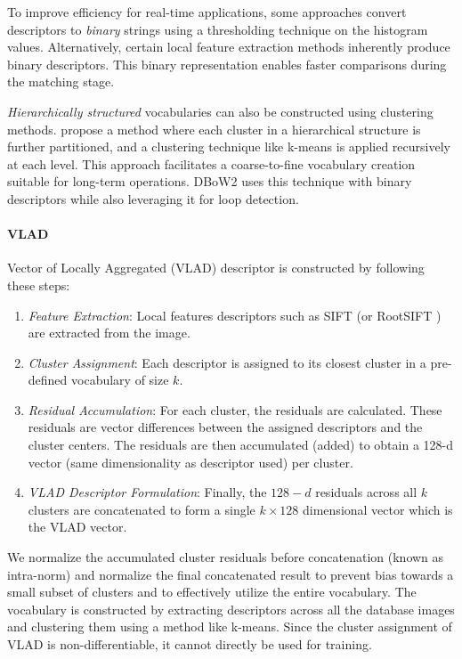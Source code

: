 To improve efficiency for real-time applications, some approaches
convert descriptors to \emph{binary} strings using a thresholding
technique on the histogram values. Alternatively, certain local
feature extraction methods inherently produce binary descriptors. This
binary representation enables faster comparisons during the matching
stage. 

\emph{Hierarchically structured} vocabularies can also be constructed
using clustering methods. \cite{Nistr2006ScalableRW} propose a method
where each cluster in a hierarchical structure is further partitioned,
and a clustering technique like k-means is applied recursively at each
level. This approach facilitates a coarse-to-fine vocabulary creation
suitable for long-term operations. DBoW2 \cite{GlvezLpez2012BagsOB}
uses this technique with binary descriptors while also leveraging it
for loop detection.

\paragraph{VLAD \cite{Arandjelovi2013AllAV, Jgou2010AggregatingLD}}
Vector of Locally Aggregated (VLAD) descriptor is constructed by
following these steps:

\begin{enumerate}
    \item \emph{Feature Extraction}: Local features descriptors such
        as SIFT (or RootSIFT \cite{Arandjelovi2012ThreeTE}) are
        extracted from the image.
    \item \emph{Cluster Assignment}: Each descriptor is assigned to
        its closest cluster in a pre-defined vocabulary of size $k$.
    \item \emph{Residual Accumulation}: For each cluster, the
        residuals are calculated. These residuals are vector
        differences between the assigned descriptors and the cluster
        centers. The residuals are then accumulated (added) to obtain
        a 128-d vector (same dimensionality as descriptor used) per
        cluster.
    \item \emph{VLAD Descriptor Formulation}: Finally, the $128-d$
        residuals across all $k$ clusters are concatenated to form a
        single $k \times 128$ dimensional vector which is the VLAD
        vector.
\end{enumerate}

We normalize the accumulated cluster residuals before concatenation
(known as intra-norm) and normalize the final concatenated result to
prevent bias towards a small subset of clusters and to effectively
utilize the entire vocabulary. The vocabulary is constructed by
extracting descriptors across all the database images and clustering
them using a method like k-means. Since the cluster assignment of VLAD
is non-differentiable, it cannot directly be used for training.

